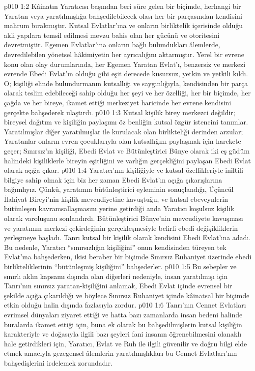\vs p010 1:2 Kâinatın Yaratıcısı başından beri süre gelen bir biçimde, herhangi bir Yaratan veya yaratılmışlığa bahşedilebilecek olası her bir parçasından kendisini mahrum bırakmıştır. Kutsal Evlatlar’ına ve onların birliktelik içerisinde olduğu akli yapılara temsil edilmesi mevzu bahis olan her gücünü ve otoritesini devretmiştir. Egemen Evlatlar’ına onların bağlı bulundukları âlemlerde, devredilebilen yönetsel hâkimiyetin her ayrıcalığını aktarmıştır. Yerel bir evrene konu olan olay durumlarında, her Egemen Yaratan Evlat’ı, benzersiz ve merkezi evrende Ebedi Evlat’ın olduğu gibi eşit derecede kusursuz, yetkin ve yetkili kıldı. O; kişiliği elinde bulundurmanın kutsallığı ve saygınlığıyla, kendisinden bir parça olarak teslim edebileceği sahip olduğu her şeyi ve her özelliği, her bir biçimde, her çağda ve her bireye, ikamet ettiği merkeziyet haricinde her evrene kendisini gerçekte bahşederek ulaştırdı.
\vs p010 1:3 Kutsal kişilik birey merkezci değildir; bireysel dağıtım ve kişiliğin paylaşımı öz benliğin kutsal özgür istencini tanımlar. Yaratılmışlar diğer yaratılmışlar ile kurulacak olan birlikteliği derinden arzular; Yaratanlar onların evren çocuklarıyla olan kutsallığını paylaşmak için harekete geçer; Sınırsız’ın kişiliği, Ebedi Evlat ve Bütünleştirici Bünye olarak iki eş güdüm halindeki kişiliklerle bireyin eşitliğini ve varlığın gerçekliğini paylaşan Ebedi Evlat olarak açığa çıkar.
\vs p010 1:4 Yaratıcı’nın kişiliğiyle ve kutsal özellikleriyle iniltili bilgiye sahip olmak için biz her zaman Ebedi Evlat’ın açığa çıkarışlarına bağımlıyız. Çünkü, yaratımın bütünleştirici eyleminin sonuçlandığı, Üçüncül İlahiyat Bireyi’nin kişilik mevcudiyetine kavuştuğu, ve kutsal ebeveynlerin bütünleşen kavramsallaşmasını yerine getirdiği anda Yaratıcı koşulsuz kişilik olarak varoluşunu sonlandırdı. Bütünleştirici Bünye’nin mevcudiyete kavuşması ve yaratımın merkezi çekirdeğinin gerçekleşmesiyle belirli ebedi değişikliklerin yerleşmeye başladı. Tanrı kutsal bir kişilik olarak kendisini Ebedi Evlat’ına adadı. Bu nedenle, Yaratıcı “sınırsızlığın kişiliğini” onun kendisinden türeyen tek Evlat’ına bahşederken, ikisi beraber bir biçimde Sınırsız Ruhaniyet üzerinde ebedi birlikteliklerinin “bütünleşmiş kişiliğini” bahşederler.
\vs p010 1:5 Bu sebepler ve sınırlı aklın kapsamı dışında olan diğerleri nedeniyle, insan yaratılmışı için Tanrı’nın sınırsız yaratan\hyp{}kişiliğini anlamak, Ebedi Evlat içinde evrensel bir şekilde açığa çıkarıldığı ve böylece Sınırsız Ruhaniyet içinde kâinatsal bir biçimde etkin olduğu halin dışında fazlasıyla zordur.
\vs p010 1:6 Tanrı'nın Cennet Evlatları evrimsel dünyaları ziyaret ettiği ve hatta bazı zamanlarda insan bedeni halinde buralarda ikamet ettiği için, buna ek olarak bu bahşedilmişlerin kutsal kişiliğin karakteriyle ve doğasıyla ilgili bazı şeyleri fani insanın öğrenebilmesini olanaklı hale getirdikleri için, Yaratıcı, Evlat ve Ruh ile ilgili güvenilir ve doğru bilgi elde etmek amacıyla gezegensel âlemlerin yaratılmışlıkları bu Cennet Evlatları’nın bahşedişlerini irdelemek zorundadır.
